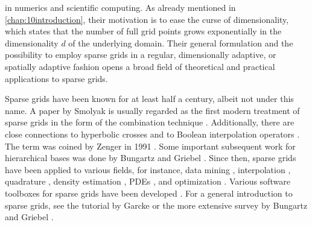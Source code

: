 
\label{chap:20sparseGrids}

in numerics and scientific computing.
As already mentioned in \cref{chap:10introduction},
their motivation is to ease the curse of dimensionality,
which states that the number of full grid points
grows exponentially in the dimensionality $d$ of the underlying domain.
Their general formulation and the possibility to employ sparse grids in a
regular, dimensionally adaptive, or spatially adaptive fashion
opens a broad field of theoretical and practical applications
to sparse grids.

Sparse grids have been known for at least half a century,
albeit not under this name.
A paper by Smolyak \cite{Smolyak63Quadrature} is usually regarded
as the first modern treatment of sparse grids in the form
of the combination technique \cite{Garcke13Sparse}.
Additionally, there are close connections to
hyperbolic crosses \cite{Temljakov82Approximation}
and to Boolean interpolation operators
.
The term  was coined by Zenger in 1991
\cite{Zenger91Sparse}.
Some important subsequent work for hierarchical bases was done by
Bungartz and Griebel
.
Since then, sparse grids have been applied to various fields,
for instance,
data mining
,
interpolation
\cite{Sickel11Spline},
quadrature
\cite{Gerstner98Numerical},
density estimation
,
PDEs
, and
optimization
.
Various software toolboxes for sparse grids have been developed
.
For a general introduction to sparse grids,
see the tutorial by Garcke \cite{Garcke13Sparse} or
the more extensive survey by Bungartz and Griebel
\cite{Bungartz04Sparse}.

